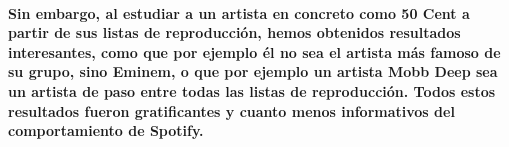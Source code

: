 \documentclass[11pt,spanish]{article}
\begin{document}
\paragraph*{Sin embargo, al estudiar a un artista en concreto como 50 Cent a partir de sus listas de reproducción, hemos obtenidos resultados interesantes, como que por ejemplo él no sea el artista más famoso de su grupo, sino Eminem, o que por ejemplo un artista Mobb Deep sea un artista de paso entre todas las listas de reproducción.
Todos estos resultados fueron gratificantes y cuanto menos informativos del comportamiento de Spotify.}
\end{document}
